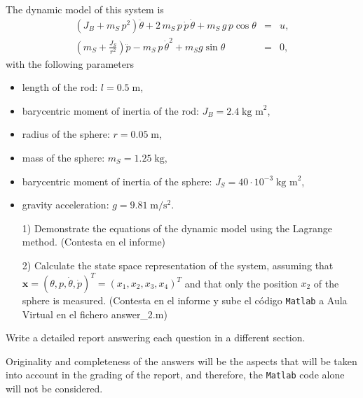 \documentclass{article}
\begin{document}
\renewcommand{\thefigure}{2}



The dynamic model of this system is
\begin{eqnarray*}
(J_B + m_S \, p^2) \ddot{\theta}  + 2 \, m_S \, p \, \dot{p} \, \dot{\theta}  + m_S \, g \, p \cos \theta &=&u, \\
\left( m_S + \frac{J_S}{r^2} \right) \ddot{p}  - m_S \, p \, \dot{\theta}^2   + m_S g \sin \theta &=&0,
\end{eqnarray*}
with the following parameters 
\begin{itemize}
\item
length of the rod: $l=0.5 \; \text{m}$,
\item
barycentric moment of inertia of the rod: $J_B = 2.4 \; \text{kg m}^2$, 
\item
radius of the sphere: $r = 0.05 \; \text{m}$,
\item
mass of the sphere: $m_S = 1.25 \; \text{kg}$, 
\item
barycentric moment of inertia of the sphere: $J_S = 40 \cdot 10^{-3} \; \text{kg m}^2$,
\item
gravity acceleration: $g = 9.81 \; \text{m}/\text{s}^2$.
\end{itemize}



















\begin{itemize}
\item[1)] Demonstrate the equations of the dynamic model using the Lagrange method.
(Contesta en el informe)

\item[2)] Calculate the state space representation of the system, assuming that $\mathbf{x} = (\theta, p, \dot{\theta}, \dot{p})^T = ( x_1,x_2,x_3,x_4)^T$ and that only the position $x_2$ of the sphere is measured.
(Contesta en el informe y sube el c\'odigo \texttt{Matlab} a Aula Virtual en el fichero answer\_2.m)



\end{itemize}

\bigskip

\noindent
{\color{red} Write a detailed report answering each question in a different section. 

\bigskip


\noindent
Originality and completeness of the answers will be the aspects that will be taken into account in the grading of the report, and therefore, the \texttt{Matlab} code alone will not be considered.} 
\end{document}
